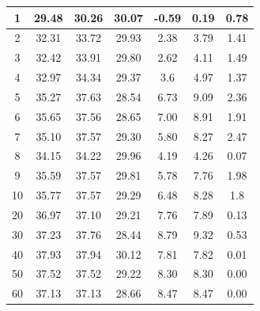 \documentclass[11pt]{article}
\begin{document}
\begin{table}[t]
\begin{center}
\begin{tabular}{|c|c|c|c|c|c|c|}
1                                                                             & 29.48                 & 30.26         & 30.07  & -0.59       & 0.19       & 0.78       \\ \hline
2                                                                             & 32.31                 & 33.72         & 29.93  & 2.38        & 3.79       & 1.41      \\ \hline
3                                                                             & 32.42                 & 33.91         & 29.80  & 2.62        & 4.11       & 1.49      \\ \hline
4                                                                             & 32.97                 & 34.34         & 29.37  & 3.6         & 4.97       & 1.37      \\ \hline
5                                                                             & 35.27                 & 37.63         & 28.54  & 6.73        & 9.09       & 2.36      \\ \hline
6                                                                             & 35.65                 & 37.56         & 28.65  & 7.00        & 8.91       & 1.91      \\ \hline
7                                                                             & 35.10                 & 37.57         & 29.30  & 5.80        & 8.27       & 2.47      \\ \hline
8                                                                             & 34.15                 & 34.22         & 29.96  & 4.19        & 4.26       & 0.07      \\ \hline
9                                                                             & 35.59                 & 37.57         & 29.81  & 5.78        & 7.76       & 1.98      \\ \hline
10                                                                            & 35.77                 & 37.57         & 29.29  & 6.48        & 8.28       & 1.8       \\ \hline
20                                                                            & 36.97                 & 37.10         & 29.21  & 7.76        & 7.89       & 0.13      \\ \hline
30                                                                            & 37.23                 & 37.76         & 28.44  & 8.79        & 9.32       & 0.53      \\ \hline
40                                                                            & 37.93                 & 37.94         & 30.12  & 7.81        & 7.82       & 0.01    \\ \hline
50                                                                            & 37.52                 & 37.52         & 29.22  & 8.30        & 8.30       & 0.00      \\ \hline
60                                                                            & 37.13                 & 37.13         & 28.66  &   8.47      & 8.47      & 0.00   \\ \hline
 

\end{tabular}
\end{center}
\end{table}
\end{document}
